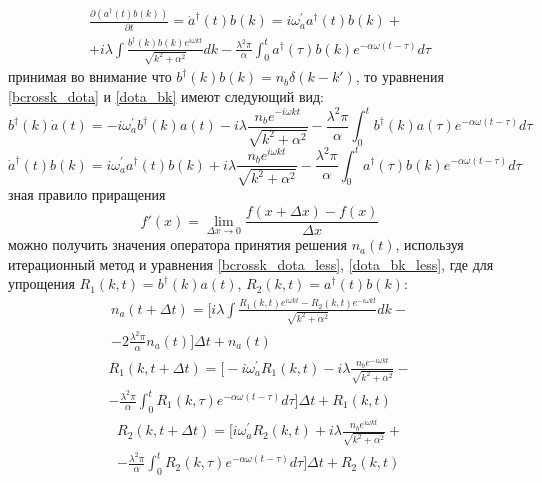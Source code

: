\begin{multline}\label{dota_bk}
    \frac{\partial (a^{\dagger}(t) b(k))}{\partial t} =
    \dot{a}^{\dagger}(t) b(k) =
    i \omega^{'}_{a} a^{\dagger}(t) b(k) + \\
    + i \lambda \int \frac{b^{\dagger}(k) b(k) e^{i \omega k t}}{\sqrt{k^{2} + \alpha^2}} dk
    - \frac{\lambda^{2} \pi}{\alpha} \int_{0}^{t} a^{\dagger}(\tau) b(k) e^{- \alpha \omega (t - \tau)} d\tau
\end{multline}
принимая во внимание что $b^{\dagger}(k) b(k) = n_{b} \delta(k-k')$, то уравнения \eqref{bcrossk_dota} и \eqref{dota_bk}
имеют следующий вид:
\begin{equation}\label{bcrossk_dota_less}
    b^{\dagger}(k) \dot{a}(t) =
    -i \omega^{'}_{a} b^{\dagger}(k) a(t)
    -i \lambda \frac{n_{b} e^{-i \omega k t}}{\sqrt{k^{2} + \alpha^2}}
    -\frac{\lambda^{2} \pi}{\alpha} \int_{0}^{t} b^{\dagger}(k) a(\tau) e^{- \alpha \omega (t - \tau)} d\tau
\end{equation}
\begin{equation}\label{dota_bk_less}
    \dot{a}^{\dagger}(t) b(k) =
    i \omega^{'}_{a} a^{\dagger}(t) b(k)
    + i \lambda \frac{n_{b} e^{i \omega k t}}{\sqrt{k^{2} + \alpha^2}}
    - \frac{\lambda^{2} \pi}{\alpha} \int_{0}^{t} a^{\dagger}(\tau) b(k) e^{- \alpha \omega (t - \tau)} d\tau
\end{equation}
зная правило приращения \[f'(x) = \lim_{\Delta x \to 0} \frac{f(x + \Delta x) - f(x)}{\Delta x}\] можно получить
значения оператора принятия решения $n_{a}(t)$, используя итерационный метод и уравнения \eqref{bcrossk_dota_less},
\eqref{dota_bk_less}, где для упрощения $R_{1}(k,t) = b^{\dagger}(k) a(t)$, $R_{2}(k,t) = a^{\dagger}(t) b(k)$:
\begin{multline}
    n_{a}(t + \Delta t) =
    \Biggl[i \lambda \int \frac{R_{1}(k,t) e^{i \omega k t} - R_{2}(k,t) e^{-i \omega k t}}{\sqrt{k^{2} + \alpha^2}} dk - \\
    - 2 \frac{\lambda^{2} \pi}{\alpha} n_{a}(t) \Biggr] \Delta t + n_{a}(t)
\end{multline}
\begin{multline}
    R_{1}(k,t + \Delta t) =
    \Biggl[-i \omega^{'}_{a} R_{1}(k,t)
    -i \lambda \frac{n_{b} e^{-i \omega k t}}{\sqrt{k^{2} + \alpha^2}} - \\
    -\frac{\lambda^{2} \pi}{\alpha} \int_{0}^{t} R_{1}(k,\tau) e^{- \alpha \omega (t - \tau)} d\tau \Biggr] \Delta t + R_{1}(k,t)
\end{multline}
\begin{multline}
    R_{2}(k,t + \Delta t) =
    \Biggl[i \omega^{'}_{a} R_{2}(k,t)
    + i \lambda \frac{n_{b} e^{i \omega k t}}{\sqrt{k^{2} + \alpha^2}} + \\
    - \frac{\lambda^{2} \pi}{\alpha} \int_{0}^{t} R_{2}(k,\tau) e^{- \alpha \omega (t - \tau)} d\tau \Biggr] \Delta t + R_{2}(k,t)
\end{multline}